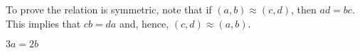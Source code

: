 \begin{list}{\bf{\ref{exer:sec73-rationals}.}}
\item \begin{list}{\bf{(a)}}
\item To prove the relation is symmetric, note that if $(a, b) \approx (c, d)$, then 
$ad = bc$.  This implies that $cb = da$ and, hence,  $(c, d) \approx (a, b)$.
\end{list}
\end{list}


\begin{list}{}
\item \begin{list}{\bf{(c)}}
\item $3a = 2b$
\end{list}
\end{list}

\hbreak
\endinput


